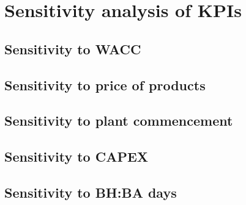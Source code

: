 \section{Sensitivity analysis of KPIs}
\subsection{Sensitivity to WACC}

\subsection{Sensitivity to price of products}
\subsection{Sensitivity to plant commencement}
\subsection{Sensitivity to CAPEX}
\subsection{Sensitivity to BH:BA days}